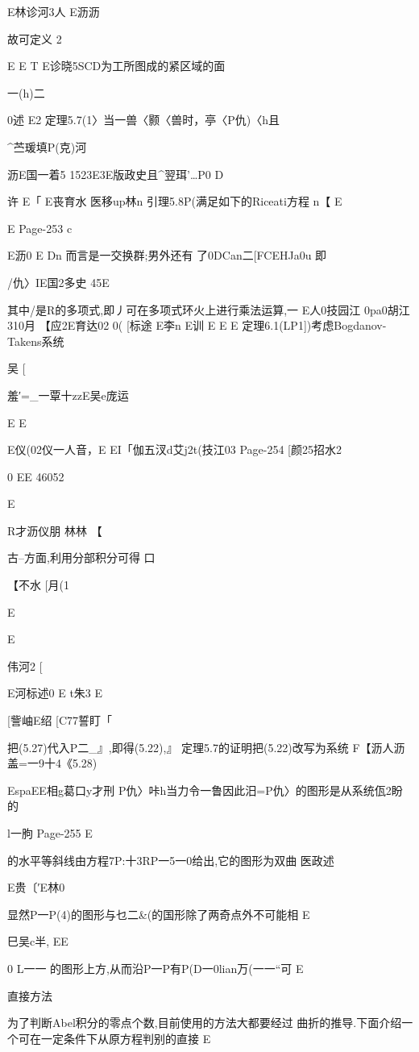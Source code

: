 {{{{{{{{{{{{{{E林诊河3人
E沥沥

故可定义
2

E
E
T
E诊晓5SCD为工所图成的紧区域的面

一(h)二

0述
E2
定理5.7(1〉当一兽〈颢〈兽时，亭〈P仇)〈h且

^苎瑗填P(克)河

沥E国一着5
1523E3E版政史且^翌珥'…P0
D

许
E「
E丧育水
医移up林n
引理5.8P(满足如下的Riceati方程
n【
E

E
Page-253
c

E沥0
E
Dn
而言是一交换群;男外还有
了0DCan二[FCEHJa0u
即

/仇〉IE国2多史
45E

其中/是R的多项式,即丿可在多项式环火上进行乘法运算,一
E人0技园江
0pa0胡江310月
【应2E育达02
0(
[标途
E李n
E训
E
E
E
定理6.1(LP1])考虑Bogdanov-Takens系统

吴
[

羞′=_一覃十zzE吴e庞运

E
E

E仪(02仪一人音，E
EI「伽五汊d艾j2t(技江03
Page-254
[颜25招水2

0
EE
46052

E

R才沥仪朋
林林
【

古--方面,利用分部积分可得
口

【不水
[月(1

E

E

{伟河2
[

E河标述0
E
t朱3
E

[訾岫E绍
[C77誓盯「

把(5.27)代入P二_』,即得(5.22),』
定理5.7的证明把(5.22)改写为系统
F【沥人沥盖=一9十4《5.28)

EspaEE相g葛口y才刑
P仇〉咔h当力令一鲁因此汨=P仇〉的图形是从系统佤2盼的

l一朐
Page-255
E

的水平等斜线由方程7P:十3RP一5一0给出,它的图形为双曲
医政述

E贵〔′E林0

显然P一P(4)的图形与乜二&(的国形除了两奇点外不可能相
E

巳吴c半,
EE

0
L一一
的图形上方,从而沿P一P有P(D一0lian万(一一“可
E

直接方法

为了判断Abel积分的零点个数,目前使用的方法大都要经过
曲折的推导.下面介绍一个可在一定条件下从原方程判别的直接
E

}}}}}}}}}}}}}}}
